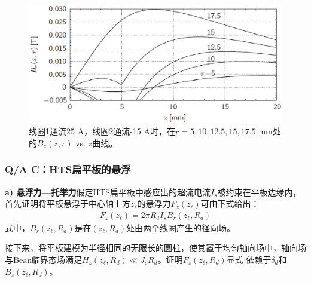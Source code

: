 \begin{figure}
	\centering
	\includegraphics[scale=0.5]{chpt9/figs/fig9.13.eps}
	\caption{线圈1通流25 A，线圈2通流-15 A时，在$r=5,10,12.5,15,17.5$ mm处的$B_z(z,r)$ vs. $z$曲线。}
\end{figure}

\subsubsection{Q/A C：HTS扁平板的悬浮}
\textbf{a) 悬浮力---托举力}\qquad 假定HTS扁平板中感应出的超流电流$I_s$被约束在平板边缘内，
首先证明将平板悬浮于中心轴上方$z_\ell$的悬浮力$F_z(z_\ell)$可由下式给出：
\begin{align*}%
F_{z}(z_{\ell})=2\pi R_{d}I_{s}B_{r}(z_{\ell},R_{d})\tag{9.3a}
\end{align*}
式中，$B_{r}(z_{\ell},R_{d})$是在$(z_{\ell},R_{d})$处由两个线圈产生的径向场。

接下来，将平板建模为半径相同的无限长的圆柱，使其置于均匀轴向场中，轴向场
与Bean临界态场满足$H_z(z_\ell,R_d)\ll J_c R_d$。证明$F_z(z_\ell,R_d)$显式
依赖于$\delta_d$和$B_z(z_\ell,R_d)$。

